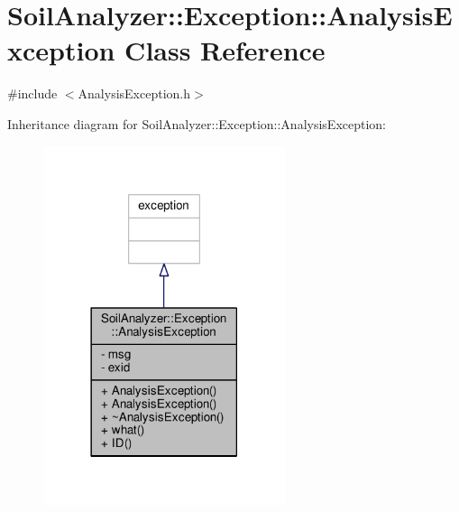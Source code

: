 \hypertarget{class_soil_analyzer_1_1_exception_1_1_analysis_exception}{}\section{Soil\+Analyzer\+:\+:Exception\+:\+:Analysis\+Exception Class Reference}
\label{class_soil_analyzer_1_1_exception_1_1_analysis_exception}


{\ttfamily \#include $<$Analysis\+Exception.\+h$>$}



Inheritance diagram for Soil\+Analyzer\+:\+:Exception\+:\+:Analysis\+Exception\+:\nopagebreak
\begin{figure}[H]
\begin{center}
\leavevmode
\includegraphics[width=201pt]{class_soil_analyzer_1_1_exception_1_1_analysis_exception__inherit__graph}
\end{center}
\end{figure}


